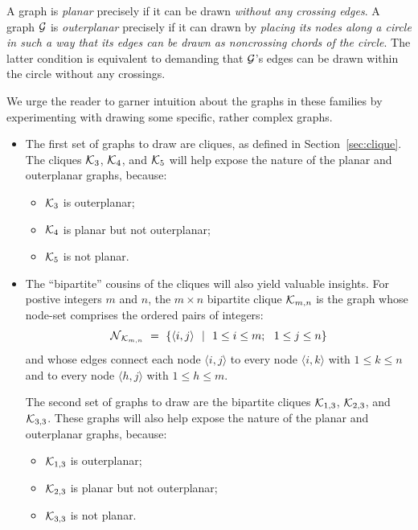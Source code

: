 \noindent
A graph is {\it planar}  
precisely if it can be drawn {\em without any crossing edges}.  A
graph $\mbox{$\cal G$}$ is {\it outerplanar} 
 precisely if it can drawn by {\em placing
  its nodes along a circle in such a way that its edges can be drawn
  as noncrossing chords of the circle}.  The latter condition is
equivalent to demanding that $\mbox{$\cal G$}$'s edges can be drawn within the
circle without any crossings.

We urge the reader to garner intuition about the graphs in these
families by experimenting with drawing some specific, rather complex
graphs.
\begin{itemize}
\item
The first set of graphs to draw are cliques, as defined in
Section~\ref{sec:clique}.  The cliques $\mbox{$\cal K$}_3$, $\mbox{$\cal K$}_4$, and
$\mbox{$\cal K$}_5$ will help expose the nature of the planar and outerplanar
graphs, because:
  \begin{itemize}
  \item
$\mbox{$\cal K$}_3$ is outerplanar; 
  \item
$\mbox{$\cal K$}_4$ is planar but not outerplanar;
  \item
$\mbox{$\cal K$}_5$ is not planar.
  \end{itemize}

\item
The ``bipartite'' cousins of the cliques will also yield valuable
insights.  For postive integers $m$ and $n$, the $m \times n$
bipartite clique $\mbox{$\cal K$}_{m,n}$  is the graph
whose node-set comprises the ordered pairs of integers:
\[  \mbox{$\cal N$}_{\mbox{{\scriptsize $\cal K$}}_{m,n}} \ = \
\{ \langle i,j \rangle \ \ | \ \ 1 \leq i \leq m; \ \ 1 \leq j \leq n\}
\]
and whose edges connect each node $\langle i,j \rangle$ to every node
$\langle i,k \rangle$ with $1 \leq k \leq n$ and to every node
$\langle h,j \rangle$ with $1 \leq h \leq m$.

The second set of graphs to draw are the bipartite cliques $\mbox{$\cal K$}_{1,3}$,
$\mbox{$\cal K$}_{2,3}$, and $\mbox{$\cal K$}_{3,3}$.  These graphs will also help expose the
nature of the planar and outerplanar graphs, because:
  \begin{itemize}
  \item
$\mbox{$\cal K$}_{1,3}$ is outerplanar; 
  \item
$\mbox{$\cal K$}_{2,3}$ is planar but not outerplanar;
  \item
$\mbox{$\cal K$}_{3,3}$ is not planar.
  \end{itemize}
\end{itemize}

